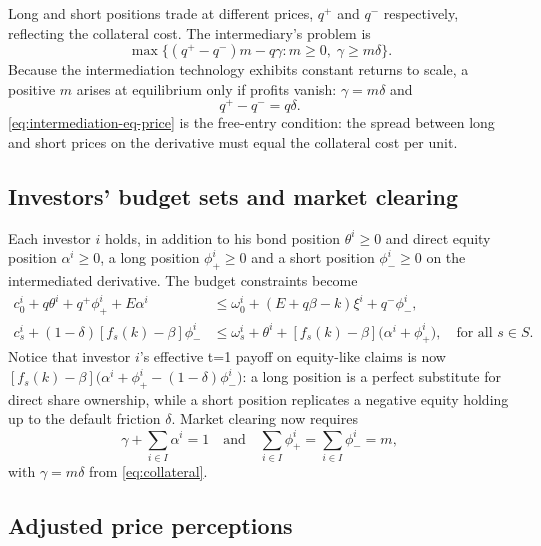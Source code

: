 \documentclass[11pt,a4paper,oneside]{book}
\def\leq{\leqslant}
\def\geq{\geqslant}
\def\et{\quad \text{and} \quad}
\theoremstyle{plain}
\theoremstyle{definition}
\theoremstyle{remark}
\numberwithin{equation}{chapter}
\begin{document}
Long and short positions trade at different prices, $q^+$ and $q^-$ respectively, reflecting the collateral cost.
The intermediary's problem is
\begin{equation}\label{eq:intermediary}
  \max \bigl\{ (q^+ - q^-) m - q \gamma \colon m \geq 0, \; \gamma \geq m \delta \bigr\}.
\end{equation}
Because the intermediation technology exhibits constant returns to scale, a positive $m$ arises at equilibrium only if profits vanish: $\gamma = m \delta$ and
\begin{equation}\label{eq:intermediation-eq-price}
  q^+ - q^- = q \delta.
\end{equation}
\eqref{eq:intermediation-eq-price} is the free-entry condition: the spread between long and short prices on the derivative must equal the collateral cost per unit.

\subsection{Investors' budget sets and market clearing}

Each investor $i$ holds, in addition to his bond position $\theta^i \geq 0$ and direct equity position $\alpha^i \geq 0$, a long position $\phi^i_+ \geq 0$ and a short position $\phi^i_- \geq 0$ on the intermediated derivative.
The budget constraints become
\begin{align}
  c^i_0 + q \theta^i + q^+ \phi^i_+ + E \alpha^i
  &\leq
  \omega^i_0 + (E + q \beta - k) \xi^i + q^- \phi^i_-,
  \label{eq:budget-0-int}\\[2pt]
  c^i_s + (1 - \delta) [f_s(k) - \beta] \phi^i_-
  &\leq
  \omega^i_s + \theta^i + [f_s(k) - \beta] \bigl( \alpha^i + \phi^i_+ \bigr),
  \quad \text{for all $s\in S$}.
  \label{eq:budget-s-int}
\end{align}
Notice that investor $i$'s effective t=1 payoff on equity-like claims is now $[f_s(k) - \beta] \bigl( \alpha^i + \phi^i_+ - (1-\delta) \phi^i_- \bigr)$: a long position is a perfect substitute for direct share ownership, while a short position replicates a negative equity holding up to the default friction $\delta$.
Market clearing now requires
\begin{equation*}
  \gamma + \sum_{i \in I} \alpha^i = 1
  \et
  \sum_{i \in I} \phi^i_+ = \sum_{i \in I} \phi^i_- = m,
\end{equation*}
with $\gamma = m \delta$ from \eqref{eq:collateral}.

\subsection{Adjusted price perceptions}
\end{document}
